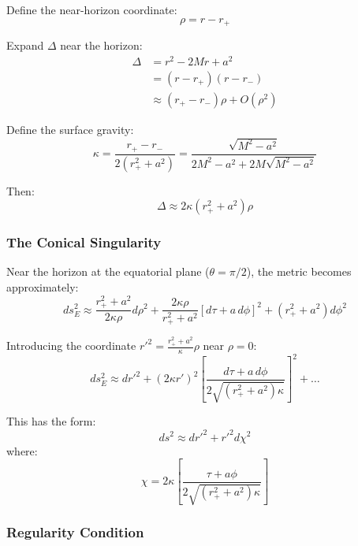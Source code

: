 \documentclass[11pt]{article}
\begin{document}
Define the near-horizon coordinate:
\begin{equation}
\rho = r - r_+
\end{equation}

Expand $\Delta$ near the horizon:
\begin{align}
\Delta &= r^2 - 2Mr + a^2 \\
&= (r - r_+)(r - r_-) \\
&\approx (r_+ - r_-)\rho + O(\rho^2)
\end{align}

Define the surface gravity:
\begin{equation}
\kappa = \frac{r_+ - r_-}{2(r_+^2 + a^2)} = \frac{\sqrt{M^2-a^2}}{2M^2 - a^2 + 2M\sqrt{M^2-a^2}}
\end{equation}

Then:
\begin{equation}
\Delta \approx 2\kappa(r_+^2 + a^2)\rho
\end{equation}

\subsubsection{The Conical Singularity}

Near the horizon at the equatorial plane ($\theta = \pi/2$), the metric becomes approximately:
\begin{equation}
ds^2_E \approx \frac{r_+^2 + a^2}{2\kappa\rho}d\rho^2 + \frac{2\kappa\rho}{r_+^2 + a^2}[d\tau + a\,d\phi]^2 + (r_+^2+a^2)d\phi^2
\end{equation}

Introducing the coordinate $r'^2 = \frac{r_+^2 + a^2}{\kappa}\rho$ near $\rho = 0$:
\begin{equation}
ds^2_E \approx dr'^2 + (2\kappa r')^2 \left[\frac{d\tau + a\,d\phi}{2\sqrt{(r_+^2+a^2)\kappa}}\right]^2 + \ldots
\end{equation}

This has the form:
\begin{equation}
ds^2 \approx dr'^2 + r'^2 d\chi^2
\end{equation}
where:
\begin{equation}
\chi = 2\kappa\left[\frac{\tau + a\phi}{2\sqrt{(r_+^2+a^2)\kappa}}\right]
\end{equation}

\subsubsection{Regularity Condition}
\end{document}
